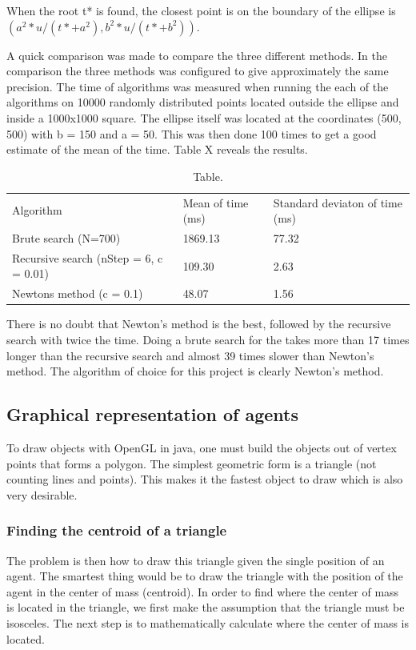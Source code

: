 \documentclass[paper=a4, fontsize=11pt,twoside]{scrartcl}		%
\begin{document}
\begin{flushleft}
When the root t* is found, the closest point is on the boundary of the ellipse is $(a^2*u/(t*+a^2), b^2*u/(t*+b^2))$.

A quick comparison was made to compare the three different methods. In the comparison the three methods was configured to give approximately the same precision. The time of algorithms was measured when running the each of the algorithms on 10000 randomly distributed points located outside the ellipse and inside a 1000x1000 square. The ellipse itself was located at the coordinates (500, 500) with b = 150 and a = 50. This was then done 100 times to get a good estimate of the mean of the time. Table X reveals the results.

\begin{table}
\begin{tabular}{lll}
Algorithm & Mean of time (ms) & Standard deviaton of time (ms) \\
Brute search (N=700) & 1869.13 & 77.32 \\
Recursive search (nStep = 6, c = 0.01) & 109.30 & 2.63 \\
Newtons method (c = 0.1) & 48.07 & 1.56
\end{tabular}
\caption{Table.}
\label{tab:ellipseComparison}
\end{table}
There is no doubt that Newton’s method is the best, followed by the recursive search with twice the time. Doing a brute search for the takes more than 17 times longer than the recursive search and almost 39 times slower than Newton’s method. The algorithm of choice for this project is clearly Newton’s method.

\subsection{Graphical representation of agents}

To draw objects with OpenGL in java, one must build the objects out of vertex points that forms a polygon. The simplest geometric form is a triangle (not counting lines and points). This makes it the fastest object to draw which is also very desirable. \newline

\subsubsection{Finding the centroid of a triangle}

The problem is then how to draw this triangle given the single position of an agent. The smartest thing would be to draw the triangle with the position of the agent in the center of mass (centroid). In order to find where the center of mass is located in the triangle, we first make the assumption that the triangle must be isosceles. The next step is to mathematically calculate where the center of mass is located. \newline


\end{flushleft}
\end{document}
